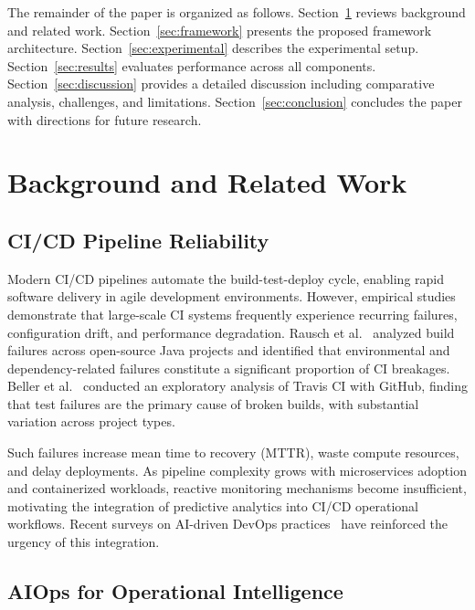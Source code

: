 \documentclass[sn-nature]{sn-jnl}
\theoremstyle{thmstyleone}
\theoremstyle{thmstyletwo}
\theoremstyle{thmstylethree}
\begin{document}
The remainder of the paper is organized as follows. Section~\ref{sec:related} reviews background and related work. Section~\ref{sec:framework} presents the proposed framework architecture. Section~\ref{sec:experimental} describes the experimental setup. Section~\ref{sec:results} evaluates performance across all components. Section~\ref{sec:discussion} provides a detailed discussion including comparative analysis, challenges, and limitations. Section~\ref{sec:conclusion} concludes the paper with directions for future research.

\section{Background and Related Work}\label{sec:related}

\subsection{CI/CD Pipeline Reliability}\label{subsec:cicd}

Modern CI/CD pipelines automate the build-test-deploy cycle, enabling rapid software delivery in agile development environments. However, empirical studies demonstrate that large-scale CI systems frequently experience recurring failures, configuration drift, and performance degradation. Rausch et al.~\cite{rausch2017empirical} analyzed build failures across open-source Java projects and identified that environmental and dependency-related failures constitute a significant proportion of CI breakages. Beller et al.~\cite{beller2017oops} conducted an exploratory analysis of Travis CI with GitHub, finding that test failures are the primary cause of broken builds, with substantial variation across project types.

Such failures increase mean time to recovery (MTTR), waste compute resources, and delay deployments. As pipeline complexity grows with microservices adoption and containerized workloads, reactive monitoring mechanisms become insufficient, motivating the integration of predictive analytics into CI/CD operational workflows. Recent surveys on AI-driven DevOps practices~\cite{kanahols2025timeseries} have reinforced the urgency of this integration.

\subsection{AIOps for Operational Intelligence}\label{subsec:aiops}
\end{document}
